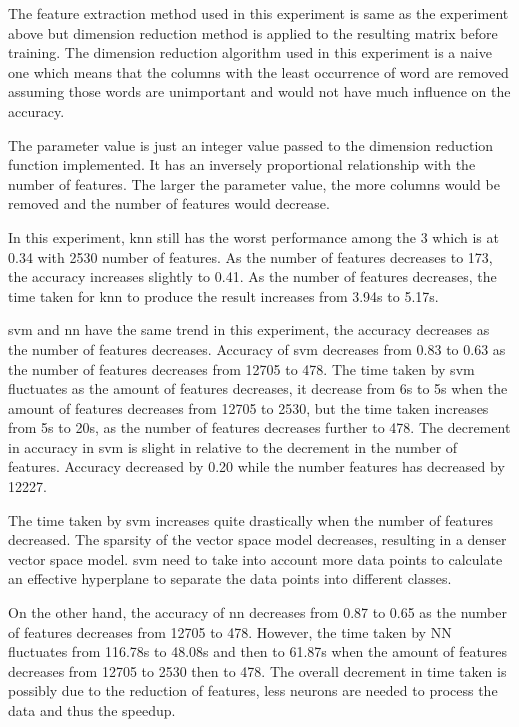 The feature extraction method used in this experiment is same as the experiment above but dimension reduction method is applied to the resulting matrix before training. The dimension reduction algorithm used in this experiment is a naive one which means that the columns with the least occurrence of word are removed assuming those words are unimportant and would not have much influence on the accuracy.

The parameter value is just an integer value passed to the dimension reduction function implemented. It has an inversely proportional relationship with the number of features. The larger the parameter value, the more columns would be removed and the number of features would decrease.

In this experiment, \ac{knn} still has the worst performance among the 3 which is at 0.34 with 2530 number of features. As the number of features decreases to 173, the accuracy increases slightly to 0.41. As the number of features decreases, the time taken for \ac{knn} to produce the result increases from 3.94s to 5.17s.

\Ac{svm} and \ac{nn} have the same trend in this experiment, the accuracy decreases as the number of features decreases. Accuracy of \ac{svm} decreases from 0.83 to 0.63 as the number of features decreases from 12705 to 478. The time taken by \ac{svm} fluctuates as the amount of features decreases, it decrease from 6s to 5s when the amount of features decreases from 12705 to 2530, but the time taken increases from 5s to 20s, as the number of features decreases further to 478. The decrement in accuracy in \ac{svm} is slight in relative to the decrement in the number of features. Accuracy decreased by 0.20 while the number features has decreased by 12227.

The time taken by \ac{svm} increases quite drastically when the number of features decreased. The sparsity of the vector space model decreases, resulting in a denser vector space model. \Ac{svm} need to take into account more data points to calculate an effective hyperplane to separate the data points into different classes.

On the other hand, the accuracy of \ac{nn} decreases from 0.87 to 0.65 as the number of features decreases from 12705 to 478. However, the time taken by NN fluctuates from 116.78s to 48.08s and then to 61.87s when the amount of features decreases from 12705 to 2530 then to 478. The overall decrement in time taken is possibly due to the reduction of features, less neurons are needed to process the data and thus the speedup.

